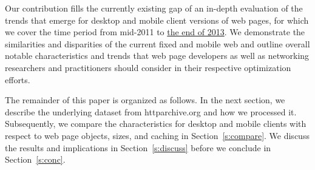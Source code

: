 \documentclass[onecolumn,12pt]{IEEEtran}
\begin{document}
Our contribution fills the currently existing gap of an in-depth evaluation of the trends that emerge for desktop and mobile client versions of web pages, for which we cover the time period from mid-2011 to \uline{the end of 2013}.
We demonstrate the similarities and disparities of the current fixed and mobile web and outline overall notable characteristics and trends that web page developers as well as networking researchers and practitioners should consider in their respective optimization efforts.

The remainder of this paper is organized as follows. 
In the next section, we describe the underlying dataset from httparchive.org and how we processed it.
Subsequently, we compare the characteristics for desktop and mobile clients with respect to web page objects, sizes, and caching in Section~\ref{s:compare}.
We discuss the results and implications in Section~\ref{s:discuss} before we conclude in Section~\ref{s:conc}.
\end{document}
